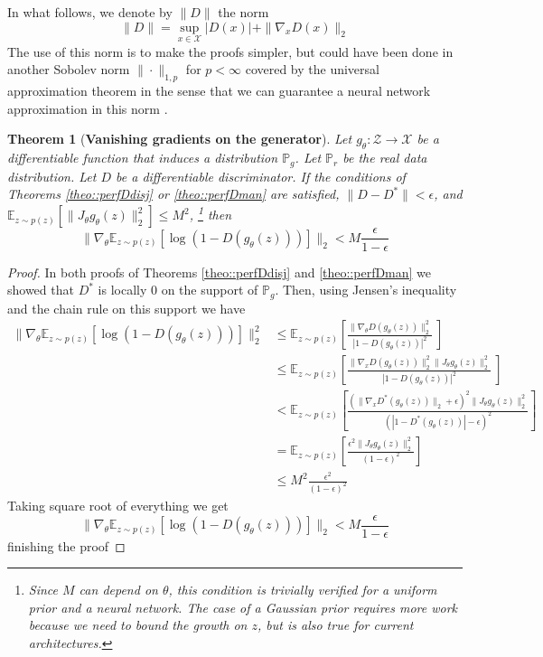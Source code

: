 \documentclass{article} %
\newcommand\EE{\mathbb{E}}
\newcommand\PP{\mathbb{P}}
\newtheorem{theo}{Theorem}[section]
\theoremstyle{definition}
\begin{document}
In what follows, we denote by $\|D\|$ the norm 
$$ \|D\| = \sup_{x \in \mathcal{X}} |D(x)| + \|\nabla_x D(x)\|_2 $$
The use of this norm is to make the proofs simpler, but could have been done in another
Sobolev norm $\|\cdot\|_{1, p}$ for $p < \infty$ covered by the universal
approximation theorem in the sense that we can guarantee a neural network approximation in this
norm \citep{Hornik-UAT}.
\begin{theo}[\textbf{Vanishing gradients on the generator}] \label{theo::vanishing}
Let $g_\theta: \mathcal{Z} \rightarrow \mathcal{X}$ be a differentiable
function that induces a distribution $\PP_g$.
Let $\PP_r$ be the real data distribution. Let $D$ be a differentiable discriminator. If the
conditions of Theorems \autoref{theo::perfDdisj} or \autoref{theo::perfDman} are satisfied, $\|D - D^*\| < \epsilon$, and
$\EE_{z \sim p(z)} \left[\|J_\theta g_\theta(z)\|_2^2\right] \leq M^2$,
\footnote{Since $M$ can depend on $\theta$, this condition is trivially verified for a
uniform prior and a neural network. The case of a Gaussian prior requires more work because
we need to bound the growth on $z$, but is also true for current architectures.} then
$$ \|\nabla_\theta \EE_{z \sim p(z)}[\log(1-D(g_\theta(z)))]\|_2 < M\frac{\epsilon}{1 - \epsilon} $$
\end{theo}
\begin{proof}
In both proofs of Theorems \autoref{theo::perfDdisj} and \autoref{theo::perfDman}
we showed that $D^*$ is locally 0 on the support of $\PP_g$.
Then, using Jensen's inequality and the chain rule on this support we have
\begin{align*}
  \|\nabla_\theta \EE_{z \sim p(z)}[\log(1-D(g_\theta(z)))]\|_2^2 &\leq \EE_{z \sim p(z)}\left[
    \frac{\|\nabla_\theta D(g_\theta(z))\|_2^2}{|1-D(g_\theta(z))|^2}\ \right] \\
  &\leq \EE_{z \sim p(z)}\left[
    \frac{\|\nabla_x D(g_\theta(z))\|_2^2 \|J_\theta g_\theta(z)\|_2^2}
  {|1-D(g_\theta(z))|^2}\ \right] \\
  &<\EE_{z \sim p(z)} \left[ \frac{\left(\|\nabla_x D^*(g_\theta(z))\|_2 + \epsilon\right)^2
    \|J_\theta g_\theta(z)\|_2^2}{\left(|1-D^*(g_\theta(z))| - \epsilon\right)^2} \right] \\
  &=\EE_{z \sim p(z)} \left[ \frac{\epsilon^2 \|J_\theta g_\theta(z)\|_2^2}{\left(1 - \epsilon
  \right)^2} \right] \\
  &\leq M^2\frac{\epsilon^2}{\left(1 - \epsilon\right)^2}
\end{align*}
Taking square root of everything we get
$$ \|\nabla_\theta \EE_{z \sim p(z)}[\log(1-D(g_\theta(z)))]\|_2 < M\frac{\epsilon}{1 - \epsilon} $$
finishing the proof
\end{proof}
\end{document}
